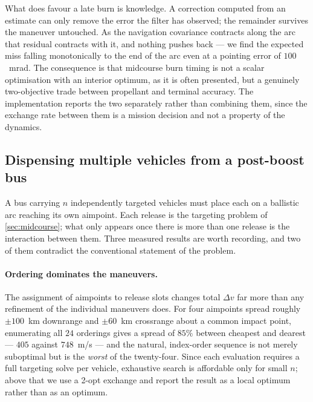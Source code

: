 \documentclass[11pt,a4paper]{article}
\theoremstyle{definition}
\numberwithin{equation}{section}
\begin{document}
What does favour a late burn is knowledge. A correction computed from an estimate can only remove the error the filter has observed; the remainder survives the maneuver untouched. As the navigation covariance contracts along the arc that residual contracts with it, and nothing pushes back --- we find the expected miss falling monotonically to the end of the arc even at a pointing error of $100$~mrad. The consequence is that midcourse burn timing is not a scalar optimisation with an interior optimum, as it is often presented, but a genuinely two-objective trade between propellant and terminal accuracy. The implementation reports the two separately rather than combining them, since the exchange rate between them is a mission decision and not a property of the dynamics.

\subsection{Dispensing multiple vehicles from a post-boost bus}
\label{sec:bus}

A bus carrying $n$ independently targeted vehicles must place each on a ballistic arc reaching its own aimpoint. Each release is the targeting problem of \cref{sec:midcourse}; what only appears once there is more than one release is the interaction between them. Three measured results are worth recording, and two of them contradict the conventional statement of the problem.

\paragraph{Ordering dominates the maneuvers.} The assignment of aimpoints to release slots changes total $\Delta v$ far more than any refinement of the individual maneuvers does. For four aimpoints spread roughly $\pm 100$~km downrange and $\pm 60$~km crossrange about a common impact point, enumerating all $24$ orderings gives a spread of $85\%$ between cheapest and dearest --- $405$ against $748$~m/s --- and the natural, index-order sequence is not merely suboptimal but is the \emph{worst} of the twenty-four. Since each evaluation requires a full targeting solve per vehicle, exhaustive search is affordable only for small $n$; above that we use a 2-opt exchange and report the result as a local optimum rather than as an optimum.
\end{document}
